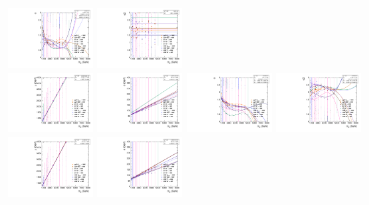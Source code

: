 \begin{figure}[htbp]
  \includegraphics[width=0.2\textwidth]{fig/analysis/paramSignalShape_allSig_MVV_LP_bb_DEtaLo_ALPHA1.pdf}
  \includegraphics[width=0.2\textwidth]{fig/analysis/paramSignalShape_allSig_MVV_LP_bb_DEtaLo_ALPHA2.pdf}\\
  \includegraphics[width=0.2\textwidth]{fig/analysis/paramSignalShape_allSig_MVV_HP_nobb_DEtaLo_MEAN.pdf}
  \includegraphics[width=0.2\textwidth]{fig/analysis/paramSignalShape_allSig_MVV_HP_nobb_DEtaLo_SIGMA.pdf}
  \includegraphics[width=0.2\textwidth]{fig/analysis/paramSignalShape_allSig_MVV_HP_nobb_DEtaLo_ALPHA1.pdf}
  \includegraphics[width=0.2\textwidth]{fig/analysis/paramSignalShape_allSig_MVV_HP_nobb_DEtaLo_ALPHA2.pdf}\\
  \includegraphics[width=0.2\textwidth]{fig/analysis/paramSignalShape_allSig_MVV_LP_nobb_DEtaLo_MEAN.pdf}
  \includegraphics[width=0.2\textwidth]{fig/analysis/paramSignalShape_allSig_MVV_LP_nobb_DEtaLo_SIGMA.pdf}

\end{figure}
